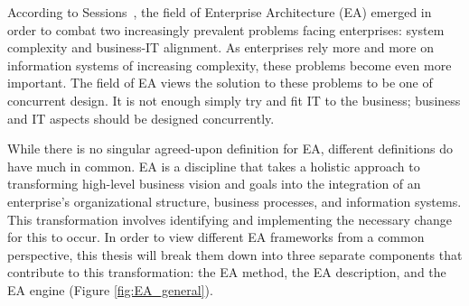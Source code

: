 



According to Sessions~\cite{sessions2007}, the field of Enterprise Architecture (EA) emerged in order to combat two increasingly prevalent problems facing enterprises: system complexity and business-IT alignment. As enterprises rely more and more on information systems of increasing complexity, these problems become even more important. The field of EA views the solution to these problems to be one of concurrent design. It is not enough simply try and fit IT to the business; business and IT aspects should be designed concurrently. 

While there is no singular agreed-upon definition for EA, different definitions\cite{jungle2004,GartnerInc,ross2006,pearlson2009,lankhorst2009,sessions2007,togaf9.1} do have much in common. EA is a discipline that takes a holistic approach to transforming high-level business vision and goals into the integration of an enterprise's organizational structure, business processes, and information systems. This transformation involves identifying and implementing the necessary change for this to occur. In order to view different EA frameworks from a common perspective, this thesis will break them down into three separate components that contribute to this transformation: the EA method, the EA description, and the EA engine (Figure \ref{fig:EA_general}). 

